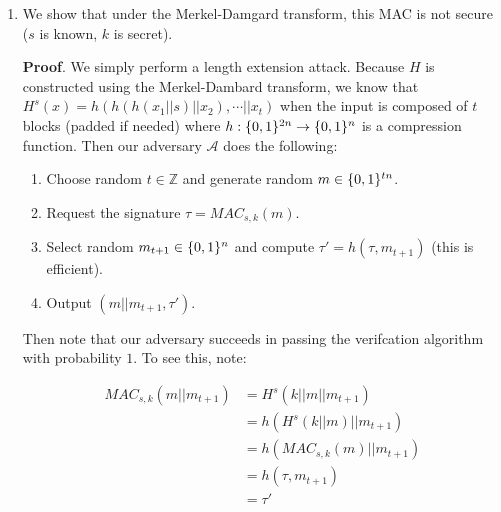 \documentclass{article}
\begin{document}
\begin{enumerate}
\begin{enumerate}[,label=\alph*.]%

\item{}
We show that under the Merkel-Damgard transform, this MAC is not secure ($s$ is known, $k$ is secret).%

\begin{mdbmarginx}{1ex}{0pt}{1ex}{0pt}%
\noindent{}\textbf{Proof}.  We simply perform a length extension attack. Because $H$ is constructed using the Merkel-Dambard
transform, we know that $H^s(x) = h(h(h(x_1 || s) || x_2), \cdots || x_t)$ when the input is 
composed of $t$ blocks (padded if needed) where $h: \{0,1\}^{2n} \to \{0,1\}^n$ is  a compression function.
Then our adversary $\mathcal{A}$ does the following:%

\begin{enumerate}[noitemsep,topsep=\mdcompacttopsep]%

\item{}Choose random $t \in \mathbb{Z}$ and generate random $m \in \{0,1\}^{tn}$.%

\item{}Request the signature $\tau = MAC_{s,k}(m)$.%

\item{}Select random $m_{t+1} \in \{0,1\}^n$ and compute $\tau' = h(\tau, m_{t+1})$ (this is efficient).%

\item{}Output $(m || m_{t+1}, \tau')$.%
\end{enumerate}%

\noindent{}Then note that our adversary succeeds in passing the verifcation algorithm with probability $1$.
To see this, note:%
\end{mdbmarginx}%
\noindent\noindent\[%
\begin{aligned}
MAC_{s,k}(m || m_{t+1}) &= H^s(k || m || m_{t+1}) \\
&= h(H^s(k || m) || m_{t+1}) \\
&= h(MAC_{s,k}(m) || m_{t+1}) \\
&= h(\tau, m_{t+1}) \\
&= \tau'
\end{aligned} 
\]%


\end{enumerate}
\end{enumerate}
\end{document}
